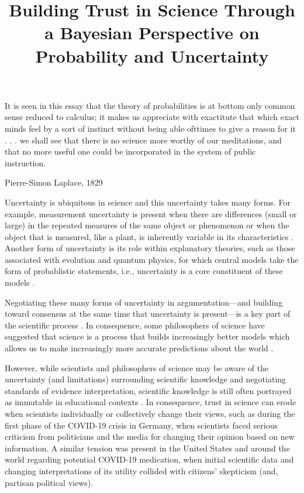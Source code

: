 \documentclass[man]{apa7}
\title{Building Trust in Science Through a Bayesian Perspective on Probability and Uncertainty}
\begin{document}
\maketitle

\setlength{\epigraphwidth}{1.0\textwidth} %
\epigraph{It is seen in this essay that the theory of probabilities is at bottom only common sense reduced to calculus; it makes us appreciate with exactitute that which exact minds feel by a sort of instinct without being able ofttimes to give a reason for it . . . we shall see that there is no science more worthy of our meditations, and that no more useful one could be incorporated in the system of public instruction.}{Pierre-Simon Laplace, 1829}
\setlength{\epigraphwidth}{0.4\textwidth} %

Uncertainty is ubiquitous in science and this uncertainty takes many forms. For example, measurement uncertainty is present when there are differences (small or large) in the repeated measures of the same object or phenomenon \parencite{pls03} or when the object that is measured, like a plant, is inherently variable in its characteristics \parencite{pls03}. Another form of uncertainty is its role within explanatory theories, such as those associated with evolution and quantum physics, for which central models take the form of probablistic statements, i.e., uncertainty is a core constituent of these models \parencite{g00}. 

Negotiating these many forms of uncertainty in argumentation—and building toward consensus at the same time that uncertainty is present—is a key part of the scientific process \parencite{t00}. In consequence, some philosophers of science have suggested that science is a process that builds increasingly better models which allows us to make increasingly more accurate predictions about the world  \parencite{g10, g06, n02, r77}.

However, while scientists and philosophers of science may be aware of the uncertainty (and limitations) surrounding scientific knowledge and negotiating standards of evidence interpretation, scientific knowledge is still often portrayed as immutable in educational contexts \parencite{d90}. In consequence, trust in science can erode when scientists individually or collectively change their views, such as during the first phase of the COVID-19 crisis in Germany, when scientists faced serious criticism from politicians and the media for changing their opinion based on new information. A similar tension was present in the United States and around the world regarding potential COVID-19 medication, when initial scientific data and changing interpretations of its utility collided with citizens’ skepticism (and, partisan political views).
\end{document}
